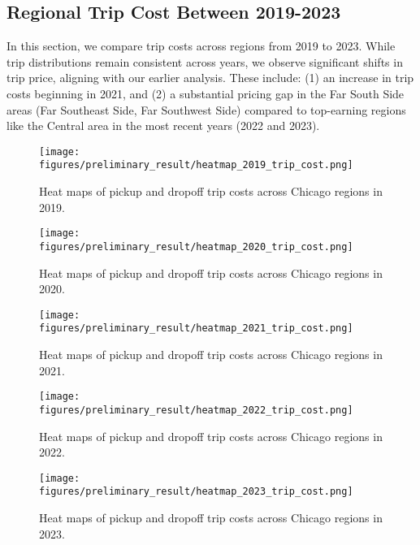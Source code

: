 \subsection{Regional Trip Cost Between 2019-2023}
In this section, we compare trip costs across regions from 2019 to 2023. While trip distributions remain consistent across years, we observe significant shifts in trip price, aligning with our earlier analysis. These include: (1) an increase in trip costs beginning in 2021, and (2) a substantial pricing gap in the Far South Side areas (Far Southeast Side, Far Southwest Side) compared to top-earning regions like the Central area in the most recent years (2022 and 2023).
\begin{figure}[h]
  \centering
\label{earning_2019}
  \texttt{[image: figures/preliminary\_result/heatmap\_2019\_trip\_cost.png]}
\caption{Heat maps of pickup and dropoff trip costs across Chicago regions in 2019.}
\end{figure}

\begin{figure}[h]
  \centering
\label{earning_2020}
  \texttt{[image: figures/preliminary\_result/heatmap\_2020\_trip\_cost.png]}
\caption{Heat maps of pickup and dropoff trip costs across Chicago regions in 2020.}
\end{figure}

\begin{figure}[h]
  \centering
\label{earning_2021}
  \texttt{[image: figures/preliminary\_result/heatmap\_2021\_trip\_cost.png]}
\caption{Heat maps of pickup and dropoff trip costs across Chicago regions in 2021.}
\end{figure}


\begin{figure}[h]
  \centering
\label{earning_2022}
  \texttt{[image: figures/preliminary\_result/heatmap\_2022\_trip\_cost.png]}
\caption{Heat maps of pickup and dropoff trip costs across Chicago regions in 2022.}
\end{figure}

\begin{figure}[h]
  \centering
\label{distribution_2023}
  \texttt{[image: figures/preliminary\_result/heatmap\_2023\_trip\_cost.png]}
\caption{Heat maps of pickup and dropoff trip costs across Chicago regions in 2023.}
\end{figure}

